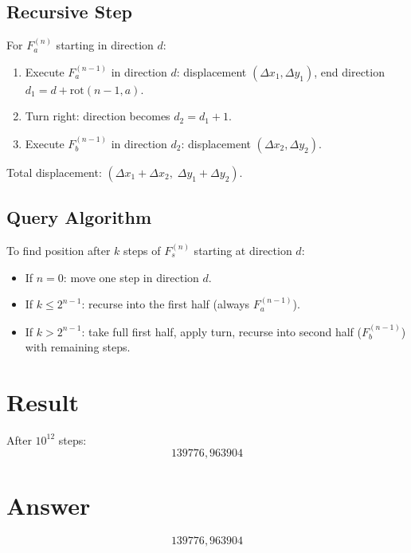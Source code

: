 \documentclass[12pt]{article}
\begin{document}
\subsection{Recursive Step}
For $F_a^{(n)}$ starting in direction $d$:
\begin{enumerate}
    \item Execute $F_a^{(n-1)}$ in direction $d$: displacement $(\Delta x_1, \Delta y_1)$, end direction $d_1 = d + \text{rot}(n{-}1, a)$.
    \item Turn right: direction becomes $d_2 = d_1 + 1$.
    \item Execute $F_b^{(n-1)}$ in direction $d_2$: displacement $(\Delta x_2, \Delta y_2)$.
\end{enumerate}
Total displacement: $(\Delta x_1 + \Delta x_2, \; \Delta y_1 + \Delta y_2)$.

\subsection{Query Algorithm}
To find position after $k$ steps of $F_s^{(n)}$ starting at direction $d$:
\begin{itemize}
    \item If $n = 0$: move one step in direction $d$.
    \item If $k \leq 2^{n-1}$: recurse into the first half (always $F_a^{(n-1)}$).
    \item If $k > 2^{n-1}$: take full first half, apply turn, recurse into second half ($F_b^{(n-1)}$) with remaining steps.
\end{itemize}

\section{Result}
After $10^{12}$ steps:
\[
\boxed{139776,963904}
\]

\section{Answer}

\[
\boxed{139776,963904}
\]
\end{document}

